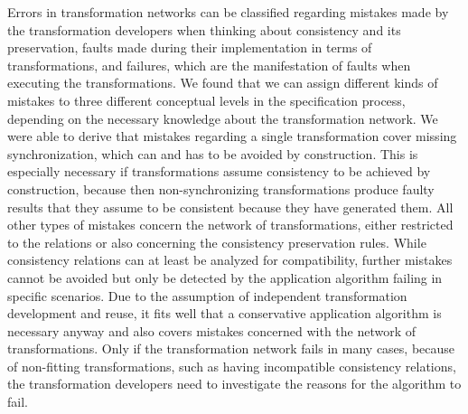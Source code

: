 \begin{insight}[Errors]
    Errors in transformation networks can be classified regarding mistakes made by the transformation developers when thinking about consistency and its preservation, faults made during their implementation in terms of transformations, and failures, which are the manifestation of faults when executing the transformations.
    We found that we can assign different kinds of mistakes to three different conceptual levels in the specification process, depending on the necessary knowledge about the transformation network.
    We were able to derive that mistakes regarding a single transformation cover missing synchronization, which can and has to be avoided by construction.
    This is especially necessary if transformations assume consistency to be achieved by construction, because then non-synchronizing transformations produce faulty results that they assume to be consistent because they have generated them.
    All other types of mistakes concern the network of transformations, either restricted to the relations or also concerning the consistency preservation rules.
    While consistency relations can at least be analyzed for compatibility, further mistakes cannot be avoided but only be detected by the application algorithm failing in specific scenarios.
    Due to the assumption of independent transformation development and reuse, it fits well that a conservative application algorithm is necessary anyway and also covers mistakes concerned with the network of transformations.
    Only if the transformation network fails in many cases, because of non-fitting transformations, such as having incompatible consistency relations, the transformation developers need to investigate the reasons for the algorithm to fail.
\end{insight}